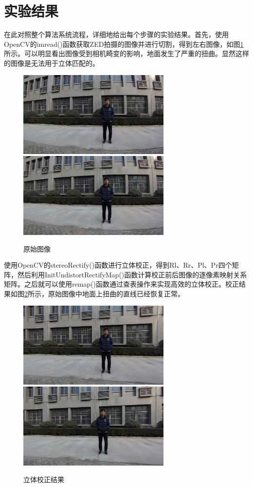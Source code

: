 \section{实验结果}
在此对照整个算法系统流程，详细地给出每个步骤的实验结果。首先，使用OpenCV的imread()函数获取ZED拍摄的图像并进行切割，得到左右图像，如图\ref{fig:5_3_原始图像}所示。可以明显看出图像受到相机畸变的影响，地面发生了严重的扭曲。显然这样的图像是无法用于立体匹配的。
\begin{figure}[htb] %
	\centering
	\includegraphics[width=3in]{figures/5_实验结果/left_7_raw}
	\includegraphics[width=3in]{figures/5_实验结果/right_7_raw}
	\caption{原始图像}\label{fig:5_3_原始图像}
\end{figure}

使用OpenCV的stereoRectify()函数进行立体校正，得到Rl、Rr、Pl、Pr四个矩阵，然后利用InitUndistortRectifyMap()函数计算校正前后图像的逐像素映射关系矩阵。之后就可以使用remap()函数通过查表操作来实现高效的立体校正。校正结果如图\ref{fig:5_3_立体校正结果}所示，原始图像中地面上扭曲的直线已经恢复正常。
\begin{figure}[htb] %
	\centering
	\includegraphics[width=3in]{figures/5_实验结果/left_7_rect}
	\includegraphics[width=3in]{figures/5_实验结果/right_7_rect}
	\caption{立体校正结果}\label{fig:5_3_立体校正结果}
\end{figure}

